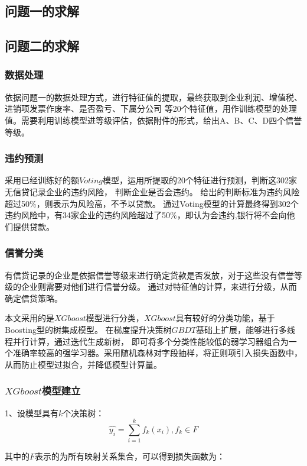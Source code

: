 \documentclass[UTF8]{ctexart}
\begin{document}
		\subsection{问题一的求解}
		
		
		
		\subsection{问题二的求解}
			\subsubsection{数据处理}
			依据问题一的数据处理方式，进行特征值的提取，最终获取到企业利润、增值税、进销项发票作废率、是否盈亏、下属分公司
			等20个特征值，用作训练模型的处理值。需要利用训练模型进等级评估，依据附件的形式，给出A、B、C、D四个信誉等级。
			\subsubsection{违约预测}
			采用已经训练好的额$Voting$模型，运用所提取的20个特征进行预测，判断这302家无信贷记录企业的违约风险，
			判断企业是否会违约。 给出的判断标准为违约风险超过50$\%$，则表示为风险高，不予以贷款。
			通过Voting模型的计算最终得到302个违约风险中，有34家企业的违约风险超过了50$\%$，即认为会违约,银行将不会向他们提供贷款。
			\subsubsection{信誉分类}
			有信贷记录的企业是依据信誉等级来进行确定贷款是否发放，对于这些没有信誉等级的企业则需要对他们进行信誉分级。
			通过对特征值的计算，来进行分级，从而确定信贷策略。
		
			本文采用的是$XGboost$模型进行分类，$XGboost$具有较好的分类功能，基于Boosting型的树集成模型。
			在梯度提升决策树$GBDT$基础上扩展，能够进行多线程并行计算，通过迭代生成新树，
			即可将多个分类性能较低的弱学习器组合为一个准确率较高的强学习器。采用随机森林对字段抽样，将正则项引入损失函数中，
			从而防止模型过拟合，并降低模型计算量。
		
			\subsubsection{$XGboost$模型建立}
			1、设模型具有$k$个决策树：
				\begin{equation}
					\hat{y_i}=\sum_{i = 1}^{k}f_k(x_i),f_k \in F    
				\end{equation}
		
				其中的$F$表示的为所有映射关系集合，可以得到损失函数为：
		
\end{document}
